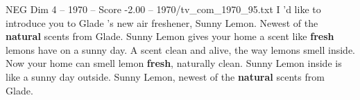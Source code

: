 \begin{textsample}{NEG Dim 4 – 1970 – Score -2.00 – 1970/tv\_com\_1970\_95.txt}  \label{ex:f4_neg_052}
I 'd like to introduce you to Glade 's new air freshener, Sunny Lemon.
Newest of the \textbf{natural} scents from Glade.
Sunny Lemon gives your home a scent like \textbf{fresh} lemons have on a sunny day.
A scent clean and alive, the way lemons smell inside.
Now your home can smell lemon \textbf{fresh}, naturally clean.
Sunny Lemon inside is like a sunny day outside.
Sunny Lemon, newest of the \textbf{natural} scents from Glade.

\end{textsample}
